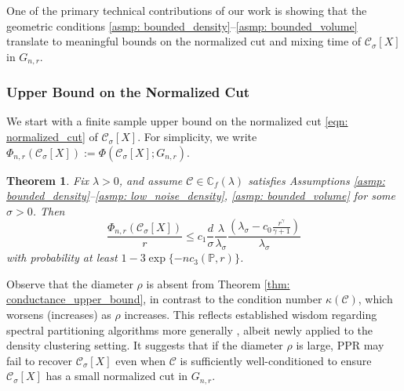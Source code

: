 \documentclass{article}
\newcommand{\1}{\mathbf{1}}
\newcommand{\Cset}{\mathcal{C}}
\newcommand{\Csig}{\Cset_{\sigma}}
\newcommand{\Pbb}{\mathbb{P}}
\newcommand{\Cbb}{\mathbb{C}}
\theoremstyle{alden}
\theoremstyle{aldenthm}
\newtheorem{theorem}{Theorem}
\theoremstyle{definition}
\theoremstyle{remark}
\begin{document}
One of the primary technical contributions of our work is showing that the geometric
conditions \ref{asmp: bounded_density}--\ref{asmp: bounded_volume} translate to 
meaningful bounds on the normalized cut and mixing time of $\Csig[X]$ in
$G_{n,r}$. 

\subsubsection{Upper Bound on the Normalized Cut} 
We start with a finite sample upper bound on the
normalized cut \eqref{eqn: normalized_cut} of $\Cset_\sigma[X]$. For
simplicity, we write $\Phi_{n,r}(\Csig[X]) := \Phi(\Csig[X]; G_{n,r})$. 

\begin{theorem}
	\label{thm: conductance_upper_bound}
	Fix $\lambda > 0$, and assume $\Cset \in \Cbb_f(\lambda)$ satisfies
	Assumptions \ref{asmp: bounded_density}--\ref{asmp: low_noise_density}, 
	\ref{asmp: bounded_volume} for some $\sigma > 0$. Then
	\begin{equation}
	\label{eqn: conductance_additive_error_bound}
	\frac{\Phi_{n,r}(\Csig[X])}{r} \leq c_1 \frac{d}{\sigma}
	\frac{\lambda}{\lambda_{\sigma}} \frac{(\lambda_{\sigma} -
		c_0\frac{r^{\gamma}}{\gamma+1})}{\lambda_{\sigma}}
	\end{equation}
	with probability at least $1 - 3\exp\{-nc_3(\Pbb,r)\}$. 
\end{theorem}
Observe that the diameter $\rho$ is absent from Theorem \ref{thm:
	conductance_upper_bound}, in contrast to the condition number
$\kappa(\Cset)$, which worsens (increases) as $\rho$ increases. This
reflects established wisdom regarding spectral partitioning
algorithms more generally \citep{guattery1995, hein2010}, albeit newly applied
to the density clustering setting. It suggests that if the diameter $\rho$ is
large, PPR may fail to recover $\Csig[X]$ even when $\Cset$ is
sufficiently well-conditioned to ensure $\Csig[X]$ has a small normalized
cut in $G_{n,r}$. 
\end{document}
